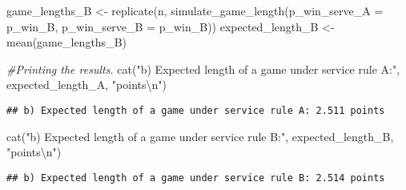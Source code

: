 \documentclass[
]{article}
\newenvironment{Shaded}{\begin{snugshade}}{\end{snugshade}}
\newcommand{\AttributeTok}[1]{\textcolor[rgb]{0.77,0.63,0.00}{#1}}
\newcommand{\CommentTok}[1]{\textcolor[rgb]{0.56,0.35,0.01}{\textit{#1}}}
\newcommand{\FunctionTok}[1]{\textcolor[rgb]{0.00,0.00,0.00}{#1}}
\newcommand{\NormalTok}[1]{#1}
\newcommand{\OtherTok}[1]{\textcolor[rgb]{0.56,0.35,0.01}{#1}}
\newcommand{\SpecialCharTok}[1]{\textcolor[rgb]{0.00,0.00,0.00}{#1}}
\newcommand{\StringTok}[1]{\textcolor[rgb]{0.31,0.60,0.02}{#1}}
\begin{document}
\begin{Shaded}
\begin{Highlighting}[]
\NormalTok{game\_lengths\_B }\OtherTok{\textless{}{-}} \FunctionTok{replicate}\NormalTok{(n, }\FunctionTok{simulate\_game\_length}\NormalTok{(}\AttributeTok{p\_win\_serve\_A =}\NormalTok{ p\_win\_B, }\AttributeTok{p\_win\_serve\_B =}\NormalTok{ p\_win\_B))}
\NormalTok{expected\_length\_B }\OtherTok{\textless{}{-}} \FunctionTok{mean}\NormalTok{(game\_lengths\_B)}

\CommentTok{\#Printing the results.}
\FunctionTok{cat}\NormalTok{(}\StringTok{"b) Expected length of a game under service rule A:"}\NormalTok{, expected\_length\_A, }\StringTok{"points}\SpecialCharTok{\textbackslash{}n}\StringTok{"}\NormalTok{)}
\end{Highlighting}
\end{Shaded}

\begin{verbatim}
## b) Expected length of a game under service rule A: 2.511 points
\end{verbatim}

\begin{Shaded}
\begin{Highlighting}[]
\FunctionTok{cat}\NormalTok{(}\StringTok{"b) Expected length of a game under service rule B:"}\NormalTok{, expected\_length\_B, }\StringTok{"points}\SpecialCharTok{\textbackslash{}n}\StringTok{"}\NormalTok{)}
\end{Highlighting}
\end{Shaded}

\begin{verbatim}
## b) Expected length of a game under service rule B: 2.514 points
\end{verbatim}
\end{document}
